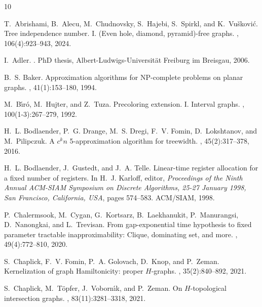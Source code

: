 \documentclass[11pt]{article}
\theoremstyle{definition}
\begin{document}
\begin{thebibliography}{10}

T.~Abrishami, B.~Alecu, M.~Chudnovsky, S.~Hajebi, S.~Spirkl, and
  K.~Vu{\v{s}}kovi{\'c}.
\newblock Tree independence number. {I}. ({Even} hole, diamond, pyramid)-free
  graphs.
, 106(4):923--943, 2024.

I.~Adler.
.
\newblock PhD thesis, Albert-Ludwigs-Universit\"at Freiburg im Breisgau, 2006.

B.~S. Baker.
\newblock Approximation algorithms for {NP}-complete problems on planar graphs.
, 41(1):153--180, 1994.

M.~B\'{\i}r\'{o}, M.~Hujter, and Z.~Tuza.
\newblock Precoloring extension. {I}. {I}nterval graphs.
, 100(1-3):267--279, 1992.

H.~L. Bodlaender, P.~G. Drange, M.~S. Dregi, F.~V. Fomin, D.~Lokshtanov, and
  M.~Pilipczuk.
\newblock A \mbox{$c^{k} n$} 5-approximation algorithm for treewidth.
, 45(2):317--378, 2016.

H.~L. Bodlaender, J.~Gustedt, and J.~A. Telle.
\newblock Linear-time register allocation for a fixed number of registers.
\newblock In H.~J. Karloff, editor, {\em Proceedings of the Ninth Annual
  {ACM-SIAM} Symposium on Discrete Algorithms, 25-27 January 1998, San
  Francisco, California, {USA}}, pages 574--583. {ACM/SIAM}, 1998.

P.~Chalermsook, M.~Cygan, G.~Kortsarz, B.~Laekhanukit, P.~Manurangsi,
  D.~Nanongkai, and L.~Trevisan.
\newblock From gap-exponential time hypothesis to fixed parameter tractable
  inapproximability: Clique, dominating set, and more.
, 49(4):772--810, 2020.

S.~Chaplick, F.~V. Fomin, P.~A. Golovach, D.~Knop, and P.~Zeman.
\newblock Kernelization of graph {H}amiltonicity: proper {$H$}-graphs.
, 35(2):840--892, 2021.

S.~Chaplick, M.~T\"{o}pfer, J.~Voborn\'{\i}k, and P.~Zeman.
\newblock On {$H$}-topological intersection graphs.
, 83(11):3281--3318, 2021.


\end{thebibliography}
\end{document}
